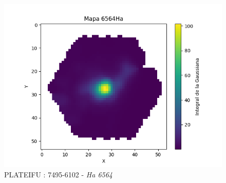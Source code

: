 \documentclass[9pt,twocolumn,a4paper]{opticajnl}
\begin{document}
\begin{figure}
    \centering
    \includegraphics[width=1\linewidth]{img7495-6102_Ha_6564_.png}
    \caption{PLATEIFU : 7495-6102 - \textit{Ha 6564}}
    \label{fig:moreinfo}
\end{figure}

\newpage
\end{document}
